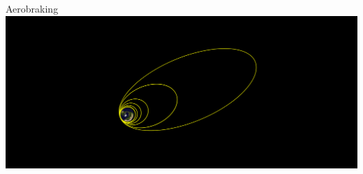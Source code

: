 \begin{frame}[t]{}
    \begin{block}{Aerobraking}
        \includegraphics[width=\textwidth]{images/aerobraking}
    \end{block}
\end{frame}
